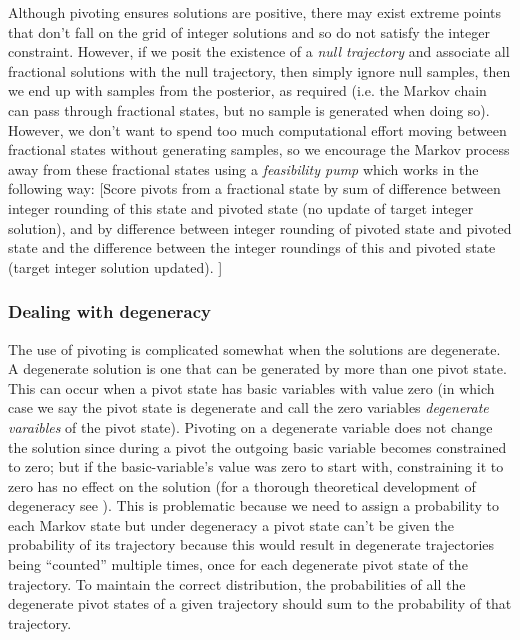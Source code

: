 \documentclass{article}
\begin{document}
Although pivoting ensures solutions are positive, there may exist extreme points that don't fall on the grid of integer solutions and so do not satisfy the integer constraint. However, if we posit the existence of a \textit{null trajectory} and associate all fractional solutions with the null trajectory, then simply ignore null samples, then we end up with samples from the posterior, as required (i.e. the Markov chain can pass through fractional states, but no sample is generated when doing so). However, we don't want to spend too much computational effort moving between fractional states without generating samples, so we encourage the Markov process away from these fractional states using a \textit{feasibility pump} which works in the following way: [Score pivots from a fractional state by sum of difference between integer rounding of this state and pivoted state (no update of target integer solution), and by difference between integer rounding of pivoted state and pivoted state and the difference between the integer roundings of this and pivoted state (target integer solution updated). ]


\subsubsection{Dealing with degeneracy}

The use of pivoting is complicated somewhat when the solutions are degenerate. A degenerate solution is one that can be generated by more than one pivot state. This can occur when a pivot state has basic variables with value zero (in which case we say the pivot state is degenerate and call the zero variables \textit{degenerate varaibles} of the pivot state). Pivoting on a degenerate variable does not change the solution since during a pivot the outgoing basic variable becomes constrained to zero; but if the basic-variable's value was zero to start with, constraining it to zero has no effect on the solution (for a thorough theoretical development of degeneracy see \cite{zornig93degeneracy}). This is problematic because we need to assign a probability to each Markov state but under degeneracy a pivot state can't be given the probability of its trajectory because this would result in degenerate trajectories being ``counted'' multiple times, once for each degenerate pivot state of the trajectory. To maintain the correct distribution, the probabilities of all the degenerate pivot states of a given trajectory should sum to the probability of that trajectory.
\end{document}
